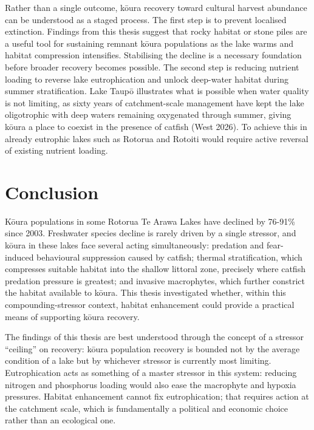 \documentclass[
  12pt,
  a4paper,
  oneside]{scrbook}
\begin{document}
Rather than a single outcome, kōura recovery toward cultural harvest
abundance can be understood as a staged process. The first step is to
prevent localised extinction. Findings from this thesis suggest that
rocky habitat or stone piles are a useful tool for sustaining remnant
kōura populations as the lake warms and habitat compression intensifies.
Stabilising the decline is a necessary foundation before broader
recovery becomes possible. The second step is reducing nutrient loading
to reverse lake eutrophication and unlock deep-water habitat during
summer stratification. Lake Taupō illustrates what is possible when
water quality is not limiting, as sixty years of catchment-scale
management have kept the lake oligotrophic with deep waters remaining
oxygenated through summer, giving kōura a place to coexist in the
presence of catfish (West 2026). To achieve this in already eutrophic
lakes such as Rotorua and Rotoiti would require active reversal of
existing nutrient loading.

\section{Conclusion}\label{conclusion-1}

Kōura populations in some Rotorua Te Arawa Lakes have declined by
76-91\% since 2003. Freshwater species decline is rarely driven by a
single stressor, and kōura in these lakes face several acting
simultaneously: predation and fear-induced behavioural suppression
caused by catfish; thermal stratification, which compresses suitable
habitat into the shallow littoral zone, precisely where catfish
predation pressure is greatest; and invasive macrophytes, which further
constrict the habitat available to kōura. This thesis investigated
whether, within this compounding-stressor context, habitat enhancement
could provide a practical means of supporting kōura recovery.

The findings of this thesis are best understood through the concept of a
stressor ``ceiling'' on recovery: kōura population recovery is bounded
not by the average condition of a lake but by whichever stressor is
currently most limiting. Eutrophication acts as something of a master
stressor in this system: reducing nitrogen and phosphorus loading would
also ease the macrophyte and hypoxia pressures. Habitat enhancement
cannot fix eutrophication; that requires action at the catchment scale,
which is fundamentally a political and economic choice rather than an
ecological one.
\end{document}

